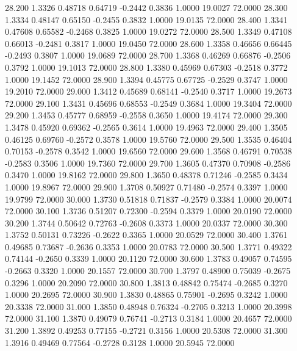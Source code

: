   28.200   1.3326   0.48718   0.64719  -0.2442   0.3836   1.0000  19.0027  72.0000
  28.300   1.3334   0.48147   0.65150  -0.2455   0.3832   1.0000  19.0135  72.0000
  28.400   1.3341   0.47608   0.65582  -0.2468   0.3825   1.0000  19.0272  72.0000
  28.500   1.3349   0.47108   0.66013  -0.2481   0.3817   1.0000  19.0450  72.0000
  28.600   1.3358   0.46656   0.66445  -0.2493   0.3807   1.0000  19.0689  72.0000
  28.700   1.3368   0.46269   0.66876  -0.2506   0.3792   1.0000  19.1013  72.0000
  28.800   1.3380   0.45969   0.67303  -0.2518   0.3772   1.0000  19.1452  72.0000
  28.900   1.3394   0.45775   0.67725  -0.2529   0.3747   1.0000  19.2010  72.0000
  29.000   1.3412   0.45689   0.68141  -0.2540   0.3717   1.0000  19.2673  72.0000
  29.100   1.3431   0.45696   0.68553  -0.2549   0.3684   1.0000  19.3404  72.0000
  29.200   1.3453   0.45777   0.68959  -0.2558   0.3650   1.0000  19.4174  72.0000
  29.300   1.3478   0.45920   0.69362  -0.2565   0.3614   1.0000  19.4963  72.0000
  29.400   1.3505   0.46125   0.69760  -0.2572   0.3578   1.0000  19.5760  72.0000
  29.500   1.3535   0.46404   0.70153  -0.2578   0.3542   1.0000  19.6560  72.0000
  29.600   1.3568   0.46791   0.70538  -0.2583   0.3506   1.0000  19.7360  72.0000
  29.700   1.3605   0.47370   0.70908  -0.2586   0.3470   1.0000  19.8162  72.0000
  29.800   1.3650   0.48378   0.71246  -0.2585   0.3434   1.0000  19.8967  72.0000
  29.900   1.3708   0.50927   0.71480  -0.2574   0.3397   1.0000  19.9799  72.0000
  30.000   1.3730   0.51818   0.71837  -0.2579   0.3384   1.0000  20.0074  72.0000
  30.100   1.3736   0.51207   0.72300  -0.2594   0.3379   1.0000  20.0190  72.0000
  30.200   1.3744   0.50642   0.72763  -0.2608   0.3373   1.0000  20.0337  72.0000
  30.300   1.3752   0.50131   0.73226  -0.2622   0.3365   1.0000  20.0529  72.0000
  30.400   1.3761   0.49685   0.73687  -0.2636   0.3353   1.0000  20.0783  72.0000
  30.500   1.3771   0.49322   0.74144  -0.2650   0.3339   1.0000  20.1120  72.0000
  30.600   1.3783   0.49057   0.74595  -0.2663   0.3320   1.0000  20.1557  72.0000
  30.700   1.3797   0.48900   0.75039  -0.2675   0.3296   1.0000  20.2090  72.0000
  30.800   1.3813   0.48842   0.75474  -0.2685   0.3270   1.0000  20.2695  72.0000
  30.900   1.3830   0.48865   0.75901  -0.2695   0.3242   1.0000  20.3338  72.0000
  31.000   1.3850   0.48948   0.76324  -0.2705   0.3213   1.0000  20.3998  72.0000
  31.100   1.3870   0.49079   0.76741  -0.2713   0.3184   1.0000  20.4657  72.0000
  31.200   1.3892   0.49253   0.77155  -0.2721   0.3156   1.0000  20.5308  72.0000
  31.300   1.3916   0.49469   0.77564  -0.2728   0.3128   1.0000  20.5945  72.0000

